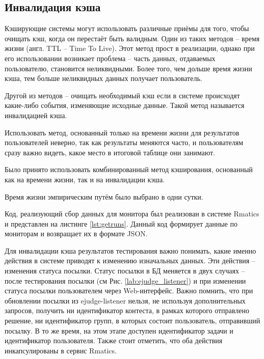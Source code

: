 \subsection{Инвалидация кэша}

Кэширующие системы могут использовать различные приёмы для того, чтобы очищать кэш, когда он перестаёт быть валидным.
Один из таких методов -- время жизни (англ. TTL -- Time To Live).
Этот метод прост в реализации, однако
при его использовании возникает проблема -- 
часть данных, отдаваемых пользователю, становится неликвидными.
Более того, чем дольше время жизни кэша, тем больше неликвидных данных получает пользователь.

Другой из методов -- очищать необходимый кэш если в системе происходят какие-либо события, изменяющие исходные данные.
Такой метод называется инвалидацией кэша.

Использовать метод, основанный только на времени жизни для результатов пользователей неверно, 
так как результаты меняются часто, и пользователям сразу важно видеть,
какое место в итоговой таблице они занимают.

Было принято использовать комбинированный метод кэширования, 
основанный как на времени жизни, так и на инвалидации кэша.

Время жизни эмпирическим путём было выбрано в одни сутки.

Код, реализующий сбор данных для монитора был реализован в системе Rmatics и представлен на листинге \ref{lst:getruns}. 
Данный код формирует данные по мониторам и возвращает их в формате JSON.



Для инвалидации кэша результатов тестирования важно понимать, 
какие именно действия в системе приводят к изменению изначальных данных.
Эти действия -- изменения статуса посылки.
Статус посылки в БД меняется в двух случаях -- после тестирования посылки (см Рис. \ref{lab:ejudge_listener}) и при изменении статуса посылки пользователем через Web-интерфейс. 
Важно помнить, что при обновлении посылки из ejudge-listener нельзя, не используя дополнительных запросов,
получить ни идентификатор контеста, в рамках которого отправлено решение, 
ни идентификатор групп, в которых состоит пользователь, отправивший посылку.
В то же время, на этом этапе доступен идентификатор задачи и идентификатор пользователя.
Также стоит отметить, что оба действия инкапсулированы в сервис Rmatics.

